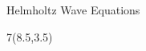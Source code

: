 
\begin{frame}{Helmholtz Wave Equations}
\begin{textblock}{7}(8.5,3.5)
\begin{myblock}[0.9]{}
\end{myblock}
\end{textblock}
\end{frame}

